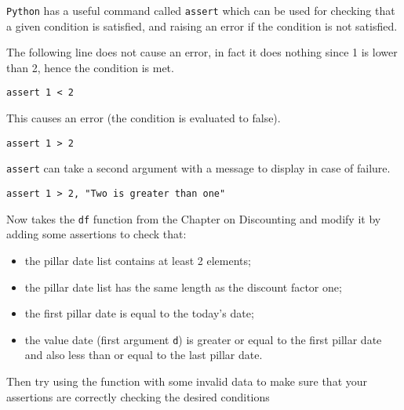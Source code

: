 \begin{question}
\texttt{Python} has a useful command called \texttt{assert} which can be used for checking that a given condition is satisfied, and raising an error if the condition is not satisfied.

The following line does not cause an error, in fact it does nothing since 1 is lower than 2, hence the condition is met.

\lstinline[language=iPython]|assert 1 < 2|

\noindent
This causes an error (the condition is evaluated to false). 

\lstinline[language=iPython]|assert 1 > 2|

\noindent
\texttt{assert} can take a second argument with a message to display in case of failure.

\lstinline[language=iPython]|assert 1 > 2, "Two is greater than one"|

\noindent
Now takes the \texttt{df} function from the Chapter on Discounting and modify it by adding some assertions to check that:

\begin{itemize}
\item the pillar date list contains at least 2 elements;
\item the pillar date list has the same length as the discount factor one;
\item the first pillar date is equal to the today's date;
\item the value date (first argument \texttt{d}) is greater or equal to the first pillar date and also less than or equal to the last pillar date.
\end{itemize}

Then try using the function with some invalid data to make sure that your assertions are correctly checking the desired conditions
\end{question}

